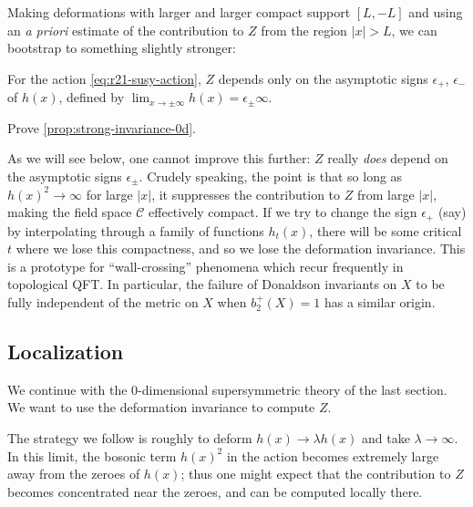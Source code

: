 \documentclass[12pt,letterpaper,reqno]{article}
\numberwithin{equation}{section}
\newcommand{\cC}{\ensuremath{\mathcal C}}
\newcommand{\abs}[1]{\lvert#1\rvert}
\newcommand{\eps}{\epsilon}
\newcommand{\ti}[1]{\textit{#1}}
\begin{document}
Making deformations with larger and larger compact support $[L,-L]$ and
using an \ti{a priori} estimate of the contribution to $Z$ from
the region $\abs{x} > L$, we can bootstrap to something slightly stronger:
\begin{prop} \label{prop:strong-invariance-0d}
For the action \eqref{eq:r21-susy-action}, 
$Z$ depends only on the asymptotic signs $\eps_+$, $\eps_-$ of $h(x)$,
defined by $\lim_{x \to \pm \infty} h(x) = \eps_{\pm} \infty$.
\end{prop}

\begin{exercise} Prove \autoref{prop:strong-invariance-0d}.
\end{exercise}

As we will see below, one cannot improve this further: $Z$ really
\ti{does} depend on the asymptotic signs $\eps_{\pm}$.
Crudely speaking, the point is that so long as $h(x)^2 \to \infty$
for large $\abs{x}$, it suppresses the contribution to $Z$ 
from large $\abs{x}$, 
making the field space $\cC$ effectively compact. If we try to change
the sign $\eps_+$ (say) by interpolating through a family of functions 
$h_t(x)$, there will be some critical $t$ where we lose this compactness,
and so we lose the deformation invariance.
This is a prototype for ``wall-crossing'' phenomena 
which recur frequently in 
topological QFT. In particular, the failure of Donaldson invariants on $X$
to be fully independent of the metric 
on $X$ when $b_2^+(X) = 1$ has a similar origin.


\subsection{Localization}

We continue with the $0$-dimensional supersymmetric theory of the last section. We want to use the deformation invariance to compute $Z$.

The strategy we follow is roughly to deform $h(x) \to \lambda h(x)$ and take
$\lambda \to \infty$.
In this limit, the bosonic term $h(x)^2$ in the action becomes extremely
large away from the zeroes of $h(x)$; thus one might expect that 
the contribution to $Z$ becomes concentrated near the zeroes,
and can be computed locally there.
\end{document}
